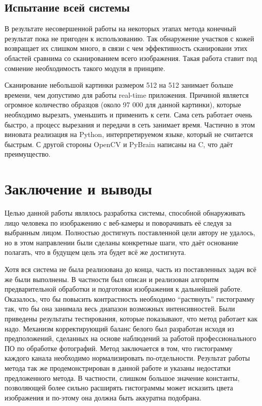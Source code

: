 \documentclass[12pt]{report}
\begin{document}
\section{Испытание всей системы}

В результате несовершенной работы на некоторых этапах метода конечный результат пока не пригоден к использованию. Так 
обнаружение участков с кожей возвращает их слишком много, в связи с чем эффективность сканировани этих областей 
сравнима со сканированием всего изображения. Такая работа ставит под сомнение необходимость такого модуля в принципе.

Сканирование небольшой картинки размером 512 на 512 занимает больше времени, чем допустимо 
для работы real-time приложения. Причиной является огромное количество образцов (около 97 000 для данной картинки), 
которые необходимо вырезать, уменьшить и применить к сети. Сама сеть работает очень быстро, а процесс вырезания и 
передачи в сеть занимает время. Частично в этом виновата реализация на Python, интерпретируемом языке, который не 
считается быстрым. С другой стороны OpenCV и PyBrain написаны на C, что даёт преимущество.

\chapter*{Заключение и выводы}
\thispagestyle{fancy}

Целью данной работы являлось разработка системы, способной обнаруживать лицо человека по изображению с веб-камеры и  
поворачивать её следуя за выбранным лицом. Полностью достигнуть поставленной цели автору не удалось, но в этом направлении были сделаны конкретные шаги, что даёт основание полагать, что в будущем цель эта будет всё же 
достигнута.

Хотя вся система не была реализована до конца, часть из поставленных задач всё же были выполнены. В частности был 
описан и реализован алгоритм предварительной обработки и подготовки изображения к дальнейшей работе. Оказалось,  
что бы повысить контрастность необходимо ``растянуть'' гистограмму так, что бы она занимала весь диапазон возможных 
интенсивностей. Были приведены результаты тестирования, которые показывают, что метод работает как надо. Механизм 
корректирующий баланс белого был разработан исходя из предположений, сделанных на основе наблюдений за работой 
профессионального ПО по обработке фотографий. Метод заключается в том, что гистограмму каждого канала необходимо 
нормализировать по-отдельности. Результат работы метода так же продемонстрирован в данной работе и указаны 
недостатки предложенного метода. В частности, слишком большое значение константы, позволяющей более сильно 
расширять гистограммы может исказить цвета изображения и по-этому она должна быть аккуратна подобрана. 
\end{document}
